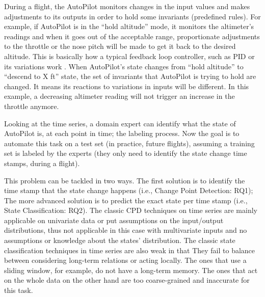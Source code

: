 

During a flight, the AutoPilot monitors changes in the input values and makes adjustments to its outputs in order to hold some invariants (predefined rules). 
For example, if AutoPilot is in the ``hold altitude'' mode, it monitors the altimeter's readings and when it goes out of the acceptable range, proportionate adjustments to the throttle or the nose pitch will be made to get it back to the desired altitude. This is basically how a typical feedback loop controller, such as PID or its variations work \cite{feedbacksystemsBook}.
When AutoPilot's state changes from ``hold altitude'' to ``descend to X ft'' state, the set of invariants that AutoPilot is trying to hold are changed. It means its reactions to variations in inputs will be different. In this example, a decreasing altimeter reading will not trigger an increase in the throttle anymore.

Looking at the time series, a domain expert can identify what the state of AutoPilot is, at each point in time; the labeling process. Now the goal is to automate this task on a test set (in practice, future flights), assuming a training set is labeled by the experts (they only need to identify the state change time stamps, during a flight). 

This problem can be tackled in two ways. The first solution is to identify the time stamp that the state change happens (i.e., Change Point Detection: RQ1); The more advanced solution is to predict the exact state per time stamp (i.e., State Classification: RQ2). The classic CPD techniques on time series \cite{Truong2018ChangePointSurvey} are mainly applicable on univariate data or put assumptions on the input/output distributions, thus not applicable in this case with multivariate inputs and no assumptions or knowledge about the states' distribution. The classic state classification techniques in time series are also weak in that %
They fail to balance between considering long-term relations or acting locally. The ones that use a sliding window, for example, do not have a long-term memory. The ones that act on the whole data on the other hand are too coarse-grained and inaccurate for this task.

